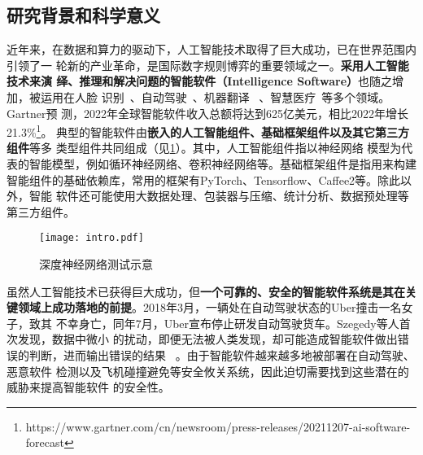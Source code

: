 
\subsection{研究背景和科学意义}



%
近年来，在数据和算力的驱动下，人工智能技术取得了巨大成功，已在世界范围内引领了一
轮新的产业革命，是国际数字规则博弈的重要领域之一。\textbf{{采用人工智能技术来演
绎、推理和解决问题的智能软件（Intelligence Software）}}也随之增加，被运用在人脸
识别~\cite{meng2021magface}、自动驾驶~\cite{zhang2018deeproad}、机器翻译
~\cite{johnson2017google}、智慧医疗~\cite{zhang2021tau}等多个领域。Gartner预
测，2022年全球智能软件收入总额将达到625亿美元，相比2022年增长
21.3\%\footnote{https://www.gartner.com/cn/newsroom/press-releases/20211207-ai-software-forecast}。
典型的智能软件由\textbf{嵌入的人工智能组件、基础框架组件以及其它第三方组件}等多
类型组件共同组成（见\cref{fig:ch1:aisoftware}）。其中，人工智能组件指以神经网络
模型为代表的智能模型，例如循环神经网络、卷积神经网络等。基础框架组件是指用来构建
智能组件的基础依赖库，常用的框架有PyTorch、Tensorflow、Caffee2等。除此以外，智能
软件还可能使用大数据处理、包装器与压缩、统计分析、数据预处理等第三方组件。

\begin{figure}[htp]
    \centering
    \texttt{[image: intro.pdf]}
    \caption{深度神经网络测试示意}
    \label{fig:ch1:aisoftware}
\end{figure}


虽然人工智能技术已获得巨大成功，但\textbf{一个可靠的、安全的智能软件系统是其在关
键领域上成功落地的前提}。2018年3月，一辆处在自动驾驶状态的Uber撞击一名女子，致其
不幸身亡，同年7月，Uber宣布停止研发自动驾驶货车。Szegedy等人首次发现，数据中微小
的扰动，即便无法被人类发现，却可能造成智能软件做出错误的判断，进而输出错误的结果
~\cite{szegedy2013intriguing}。由于智能软件越来越多地被部署在自动驾驶、恶意软件
检测以及飞机碰撞避免等安全攸关系统，因此迫切需要找到这些潜在的威胁来提高智能软件
的安全性。

